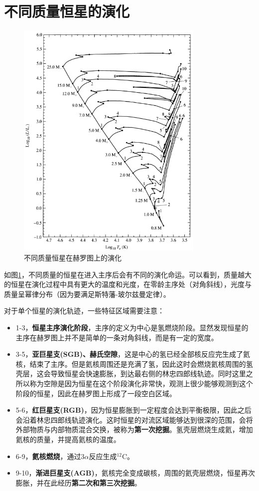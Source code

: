 \documentclass[openany]{ctexbook}
\begin{document}
\section{不同质量恒星的演化}
\begin{figure}[hbt]
  \centering
  \includegraphics[width=9cm]{chapters/13/HRD}
  \caption{不同质量恒星在赫罗图上的演化}
  \label{fig:HRDM}
\end{figure}

如图\ref{fig:HRDM}，不同质量的恒星在进入主序后会有不同的演化命运。可以看到，质量越大的恒星在演化过程中具有更大的温度和光度，在零龄主序处（对角斜线），光度与质量呈幂律分布（因为要满足斯特藩-玻尔兹曼定律）。

对于单个恒星的演化轨迹，一些特征区域需要注意：
\begin{itemize}
  \item 1-3，\textbf{恒星主序演化阶段}，主序的定义为中心是氢燃烧阶段。显然发现恒星的主序在赫罗图上并不是简单的一条对角斜线，而是有一定的宽度。
  \item 3-5，\textbf{亚巨星支(SGB)、赫氏空隙}，这是中心的氢已经全部核反应完生成了氦核，结束了主序。但是氦核周围还是充满了氢，因此这时会燃烧氦核周围的氢壳层，这会导致恒星会快速膨胀，到达最右侧的林忠四郎线轨迹。同时这里之所以称为空隙是因为恒星在这个阶段演化非常快，观测上很少能够观测到这个阶段的恒星，因此在赫罗图上形成了一段空白区域。
  \item 5-6，\textbf{红巨星支(RGB)}，因为恒星膨胀到一定程度会达到平衡极限，因此之后会沿着林忠四郎线轨迹演化。这时恒星的对流区域能够达到很深的范围，会将外部物质与内部物质混合交换，被称为\textbf{第一次挖掘}。氢壳层燃烧生成氦，增加氦核的质量，并提高氦核的温度。
  \item 6-9，\textbf{氦核燃烧}，通过3$\alpha$反应生成$^{12}$C。
  \item 9-10，\textbf{渐进巨星支(AGB)}，氦核完全变成碳核，周围的氦壳层燃烧，恒星再次膨胀，并在此经历\textbf{第二次和第三次挖掘}。
\end{itemize}
\end{document}

